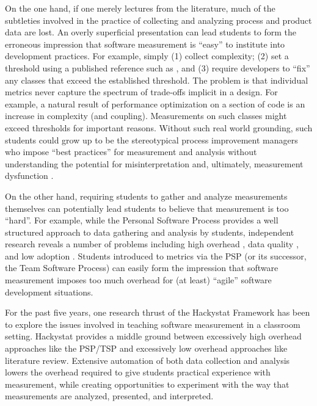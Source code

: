 \documentclass{acm_proc_article-sp}
\begin{document}
On the one hand, if one merely lectures from the literature, much of the
subtleties involved in the practice of collecting and analyzing process and
product data are lost.  An overly superficial presentation can lead
students to form the erroneous impression that software measurement is
``easy'' to institute into development practices. For example, simply (1)
collect complexity; (2) set a threshold using a published reference such as
\cite{Clark08}, and (3) require developers to ``fix'' any classes that
exceed the established threshold.  The problem is that individual metrics
never capture the spectrum of trade-offs implicit in a design. For example,
a natural result of performance optimization on a section of code is an
increase in complexity (and coupling). Measurements on such classes might
exceed thresholds for important reasons.  Without such real world
grounding, such students could grow up to be the stereotypical process
improvement managers who impose ``best practices'' for measurement and
analysis without understanding the potential for misinterpretation and,
ultimately, measurement dysfunction \cite{Austin96}.

On the other hand, requiring students to gather and analyze measurements
themselves can potentially lead students to believe that measurement is too
``hard''.  For example, while the Personal Software Process
\cite{Humphrey95} provides a well structured approach to data gathering and
analysis by students, independent research reveals a number of problems
including high overhead \cite{csdl2-01-12}, data quality \cite{csdl-98-13},
and low adoption \cite{Borstler02}.  Students introduced to metrics via the
PSP (or its successor, the Team Software Process) can easily form the
impression that software measurement imposes too much overhead for (at
least) ``agile'' software development situations.

For the past five years, one research thrust of the Hackystat Framework has been
to explore the issues involved in teaching software measurement in a
classroom setting.  Hackystat provides a middle ground between excessively
high overhead approaches like the PSP/TSP and excessively low overhead
approaches like literature review.  Extensive automation of both data
collection and analysis lowers the overhead required to give students
practical experience with measurement, while creating opportunities to
experiment with the way that measurements are analyzed, presented, and
interpreted.
\end{document}
